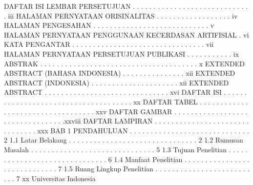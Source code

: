 DAFTAR ISI
LEMBAR PERSETUJUAN . . . . . . . . . . . . . . . . . . . . . . . . . . . . . iii
HALAMAN PERNYATAAN ORISINALITAS . . . . . . . . . . . . . . . . . . iv
HALAMAN PENGESAHAN . . . . . . . . . . . . . . . . . . . . . . . . . . . . v
HALAMAN PERNYATAAN PENGGUNAAN KECERDASAN ARTIFISIAL . vi
KATA PENGANTAR . . . . . . . . . . . . . . . . . . . . . . . . . . . . . . . . vii
HALAMAN PERNYATAAN PERSETUJUAN PUBLIKASI . . . . . . . . . . . ix
ABSTRAK . . . . . . . . . . . . . . . . . . . . . . . . . . . . . . . . . . . . . . x
EXTENDED ABSTRACT (BAHASA INDONESIA) . . . . . . . . . . . . . . . xii
EXTENDED ABSTRACT (INDONESIA) . . . . . . . . . . . . . . . . . . . . . xii
EXTENDED ABSTRACT . . . . . . . . . . . . . . . . . . . . . . . . . . . . . . xvi
DAFTAR ISI . . . . . . . . . . . . . . . . . . . . . . . . . . . . . . . . . . . . . xx
DAFTAR TABEL . . . . . . . . . . . . . . . . . . . . . . . . . . . . . . . . . . xxv
DAFTAR GAMBAR . . . . . . . . . . . . . . . . . . . . . . . . . . . . . . . . .xxviii
DAFTAR LAMPIRAN . . . . . . . . . . . . . . . . . . . . . . . . . . . . . . . xxx
BAB 1 PENDAHULUAN . . . . . . . . . . . . . . . . . . . . . . . . . . . . . 2
1.1 Latar Belakang . . . . . . . . . . . . . . . . . . . . . . . . . . . . . . . 2
1.2 Rumusan Masalah . . . . . . . . . . . . . . . . . . . . . . . . . . . . . . 5
1.3 Tujuan Penelitian . . . . . . . . . . . . . . . . . . . . . . . . . . . . . . 6
1.4 Manfaat Penelitian . . . . . . . . . . . . . . . . . . . . . . . . . . . . . 7
1.5 Ruang Lingkup Penelitian . . . . . . . . . . . . . . . . . . . . . . . . . . 7
xx Universitas Indonesia


